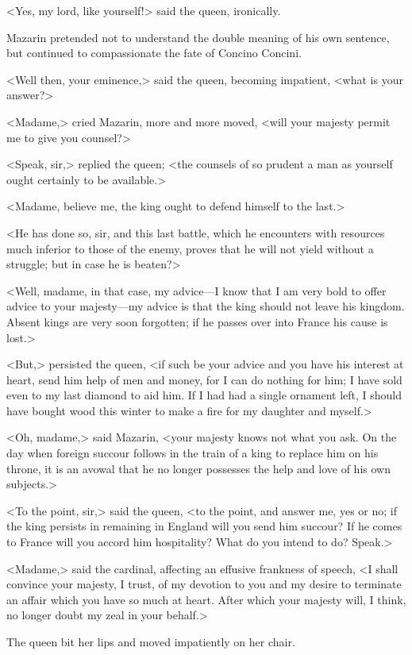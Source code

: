 <Yes, my lord, like yourself!> said the queen, ironically.

Mazarin pretended not to understand the double meaning of his own sentence, but continued to compassionate the fate of Concino Concini.

<Well then, your eminence,> said the queen, becoming impatient, <what is your answer?>

<Madame,> cried Mazarin, more and more moved, <will your majesty permit me to give you counsel?>

<Speak, sir,> replied the queen; <the counsels of so prudent a man as yourself ought certainly to be available.>

<Madame, believe me, the king ought to defend himself to the last.>

<He has done so, sir, and this last battle, which he encounters with resources much inferior to those of the enemy, proves that he will not yield without a struggle; but in case he is beaten?>

<Well, madame, in that case, my advice—I know that I am very bold to offer advice to your majesty—my advice is that the king should not leave his kingdom. Absent kings are very soon forgotten; if he passes over into France his cause is lost.>

<But,> persisted the queen, <if such be your advice and you have his interest at heart, send him help of men and money, for I can do nothing for him; I have sold even to my last diamond to aid him. If I had had a single ornament left, I should have bought wood this winter to make a fire for my daughter and myself.>

<Oh, madame,> said Mazarin, <your majesty knows not what you ask. On the day when foreign succour follows in the train of a king to replace him on his throne, it is an avowal that he no longer possesses the help and love of his own subjects.>

<To the point, sir,> said the queen, <to the point, and answer me, yes or no; if the king persists in remaining in England will you send him succour? If he comes to France will you accord him hospitality? What do you intend to do? Speak.>

<Madame,> said the cardinal, affecting an effusive frankness of speech, <I shall convince your majesty, I trust, of my devotion to you and my desire to terminate an affair which you have so much at heart. After which your majesty will, I think, no longer doubt my zeal in your behalf.>

The queen bit her lips and moved impatiently on her chair.


